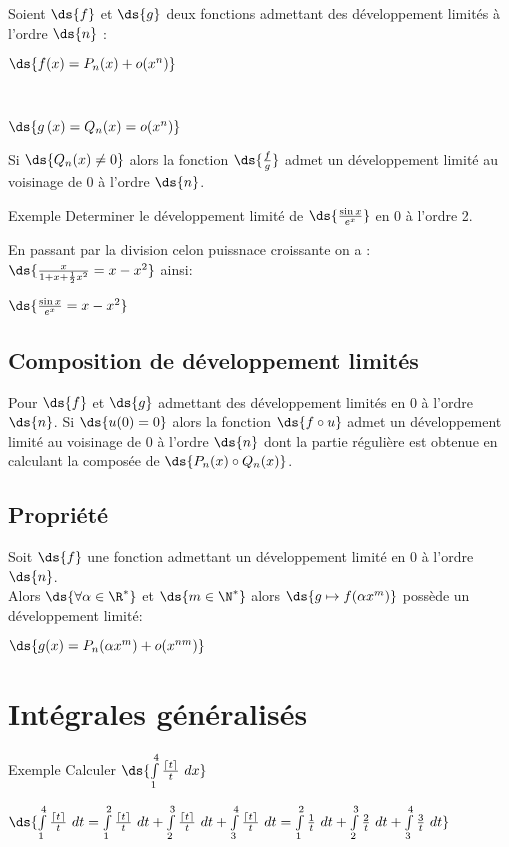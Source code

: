 \documentclass[11pt]{book}
\begin{document}
	Soient $\ds{f}$ et $\ds{g}$ deux fonctions admettant des développement limités à l'ordre $\ds{n}$ : \\
	\centerline{$\ds{f(x)=P_n(x)+o(x^{n})}$} \\
	\centerline{$\ds{g\left(x  \right) = Q_n(x)=o(x^n)}$}

	Si $\ds{Q_n(x)\neq 0}$ alors la fonction $\ds{\frac{f}{g}}$ admet un développement limité au voisinage de 0 à l'ordre $\ds{n}$.

	\begin{dent}{Exemple}
		Determiner le développement limité de $\ds{\frac{\sin x}{e^x}}$ en 0 à l'ordre 2.

		En passant par la division celon puissnace croissante on a : $\ds{\frac{x}{1+x+\frac{1}{2}x^2}=x-x^2}$ ainsi: \\
		\centerline{$\ds{\frac{\sin x}{e^x}=x-x^2}$}
	\end{dent}

\newpage

	\subsection{Composition de développement limités}

	Pour $\ds{f}$ et $\ds{g}$ admettant des développement limités en 0 à l'ordre $\ds{n}$. Si $\ds{u(0)=0}$ alors la fonction $\ds{f\circ u}$ admet un développement limité au voisinage de 0 à l'ordre $\ds{n}$ dont la partie régulière est obtenue en calculant la composée de $\ds{P_n(x)\circ Q_n(x)}$.

	\subsection{Propriété}

	Soit $\ds{f}$ une fonction admettant un développement limité en 0 à l'ordre $\ds{n}$. \\
	Alors $\ds{\forall \alpha \in \R^*}$ et $\ds{m \in \N^*}$ alors $\ds{g\mapsto f(\alpha x^{m})}$ possède un développement limité: \\
	\centerline{$\ds{g(x)=P_n(\alpha x^m)+o(x^{nm})}$}

	\section{Intégrales généralisés}

	\begin{dent}{Exemple}
		Calculer $\ds{\int\limits_{1}^{4} \frac{\left\lceil t \right\rceil }{t} \  d x }$ 

	\centerline{$\ds{\int\limits_{1}^{4} \frac{\left\lceil t \right\rceil }{t} \  d t = \int\limits_{1}^{2} \frac{\left\lceil t \right\rceil }{t} \  d t +\int\limits_{2}^{3} \frac{\left\lceil t \right\rceil }{t} \  d t +\int\limits_{3}^{4} \frac{\left\lceil t \right\rceil }{t} \  d t= \int\limits_{1}^{2} \frac{1}{t} \  d t +\int\limits_{2}^{3} \frac{2}{t} \  d t +\int\limits_{3}^{4} \frac{3}{t} \  d t  }$}

	\end{dent}
	 
\end{document}
